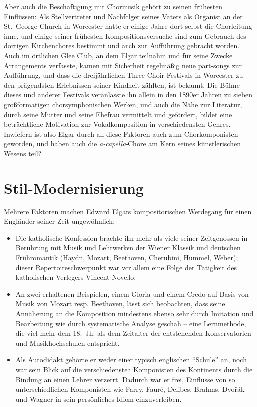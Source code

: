 \documentclass[a4paper,11pt,open=any]{scrbook}
\begin{document}
Aber auch die Beschäftigung mit Chormusik gehört zu seinen frühesten
Einflüssen: Als Stellvertreter und Nachfolger seines Vaters als Organist
an der St.~George Church in Worcester hatte er einige Jahre dort selbst
die Chorleitung inne, und einige seiner frühesten Kompositionsversuche sind
zum Gebrauch des dortigen Kirchenchores bestimmt und auch zur Aufführung
gebracht worden.  Auch im örtlichen Glee Club, an dem Elgar teilnahm und für
seine Zwecke Arrangements verfasste, kamen mit Sicherheit regelmäßig neue
part-songs zur Aufführung, und dass die dreijährlichen Three Choir Festivals
in Worcester zu den prägendsten Erlebnissen seiner Kindheit zählten, ist
bekannt\cite[S.~30f., 43, 57, etc.]{moore}.  Die Bühne dieses und anderer
Festivals veranlasste ihn allein in den 1890er Jahren zu sieben großformatigen
chorsymphonischen Werken, und auch die Nähe zur Literatur, durch seine
Mutter und seine Ehefrau vermittelt und gefördert, bildet eine beträchtliche
Motivation zur Vokalkomposition in verschiedensten Genres.  Inwiefern ist
also Elgar durch all diese Faktoren auch zum Chorkomponisten geworden, und
haben auch die \textit{a-capella}-Chöre am Kern seines künstlerischen Wesens
teil?

\section{Stil-Modernisierung}
Mehrere Faktoren machen Edward Elgars kompositorischen Werdegang für einen
Engländer seiner Zeit ungewöhnlich:

\begin{itemize}
 \item Die katholische Konfession brachte ihn mehr als viele seiner
 Zeitgenossen in Berührung mit Musik und Lehrwerken der Wiener Klassik
 und deutschen Frühromantik (Haydn, Mozart, Beethoven, Cherubini, Hummel,
 Weber); dieser Repertoireschwerpunkt war vor allem eine Folge der Tätigkeit
 des katholischen Verlegers Vincent Novello.

 \item An zwei erhaltenen Beispielen, einem Gloria und einem Credo auf Basis
 von Musik von Mozart resp. Beethoven, lässt sich beobachten, dass seine
 Annäherung an die Komposition mindestens ebenso sehr durch Imitation und
 Bearbeitung wie durch systematische Analyse geschah – eine Lernmethode, die
 viel mehr dem 18.~Jh. als dem Zeitalter der entstehenden Konservatorien und
 Musikhochschulen entspricht.

 \item Als Autodidakt gehörte er weder einer typisch englischen
 \enquote{Schule} an, noch war sein Blick auf die verschiedensten
 Komponisten des Kontinents durch die Bindung an einen Lehrer verzerrt.
 Dadurch war er frei, Einflüsse von so unterschiedlichen Komponisten wie
 Parry, Fauré, Delibes, Brahms, Dvořák und Wagner in sein persönliches
 Idiom einzuverleiben.
\end{itemize}
\end{document}
